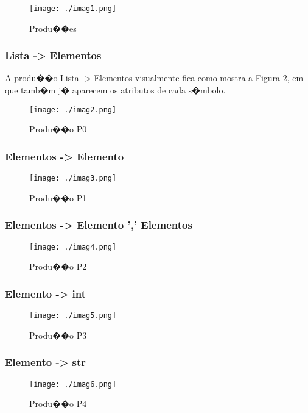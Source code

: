 \documentclass[a4paper]{article}
\begin{document}
\begin{figure}[H]
 \centering
 \texttt{[image: ./imag1.png]}
 \caption{Produ��es}
\end{figure}

\subsubsection{Lista -> Elementos}
A produ��o Lista -> Elementos visualmente fica como mostra a Figura 2, 
em que tamb�m j� aparecem os atributos de cada s�mbolo.

\begin{figure}[H]
 \centering
 \texttt{[image: ./imag2.png]}
 \caption{Produ��o P0}
\end{figure}


\subsubsection{Elementos -> Elemento}
\begin{figure}[H]
 \centering
 \texttt{[image: ./imag3.png]}
 \caption{Produ��o P1}
\end{figure}


\subsubsection{Elementos -> Elemento ',' Elementos}
\begin{figure}[H]
 \centering
 \texttt{[image: ./imag4.png]}
 \caption{Produ��o P2}
\end{figure}


\subsubsection{Elemento -> int}
\begin{figure}[H]
 \centering
 \texttt{[image: ./imag5.png]}
 \caption{Produ��o P3}
\end{figure}

\subsubsection{Elemento -> str}
\begin{figure}[H]
 \centering
 \texttt{[image: ./imag6.png]}
 \caption{Produ��o P4}
\end{figure}
\end{document}
